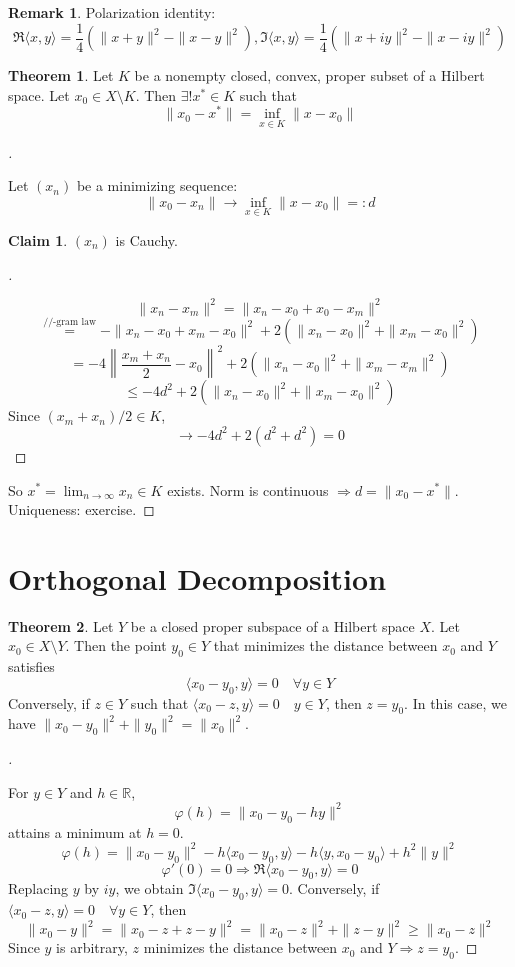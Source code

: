 \documentclass{article}
\theoremstyle{definition}
\newtheorem{thm}{Theorem}
\newtheorem{rem}{Remark}
\newtheorem*{clm}{Claim}
\newenvironment{proofs}[1][\proofname]{%
  \begin{proof}[#1]$ $\par\nobreak\ignorespaces
}{%
  \end{proof}
}
\begin{document}
\begin{rem}
	Polarization identity:
	\[
		\Re \langle x, y \rangle = \frac{1}{4} (\|x + y \|^2 - \|x - y \|^2), \Im \langle x, y \rangle = \frac{1}{4} (\|x + iy\|^2 - \|x - iy \|^2)
	\]
\end{rem}

\begin{thm}
	Let $K$ be a nonempty closed, convex, proper subset of a Hilbert space.
	Let $x_0 \in X \setminus K$.
	Then $\exists ! x^* \in K$ such that
	\[
		\|x_0 - x^*\| = \inf_{x \in K} \|x - x_0\|
	\]
\end{thm}

\begin{proofs}
	Let $(x_n)$ be a minimizing sequence:
	\[
		\|x_0 - x_n\| \to \inf_{x \in K} \|x - x_0\| =: d
	\]
	\begin{clm}
		$(x_n)$ is Cauchy.
	\end{clm}

	\begin{proofs}
		\[
			\|x_n - x_m\|^2 = \|x_n - x_0 + x_0 - x_m\|^2
		\]
		\[
			\stackrel{\text{//-gram law}}{=} - \|x_n - x_0 + x_m - x_0\|^2 + 2 (\|x_n - x_0\|^2 + \|x_m - x_0\|^2)
		\]
		\[
			= -4 \left\| \frac{x_m + x_n}{2} - x_0 \right\|^2 + 2 (\|x_n - x_0\|^2 + \|x_m - x_m\|^2)
		\]
		\[
			\leq -4d^2 + 2(\|x_n - x_0\|^2 + \|x_m - x_0\|^2)
		\]
		Since $(x_m + x_n)/2 \in K$, 
		\[
			\to -4d^2 + 2(d^2 + d^2) = 0
		\]
	\end{proofs}
	So $x^* = \lim_{n \to \infty} x_n \in K$ exists.
	Norm is continuous $\Rightarrow d = \|x_0 - x^*\|$.
	Uniqueness: exercise.
\end{proofs}

\section{Orthogonal Decomposition}

\begin{thm}
	Let $Y$ be a closed proper subspace of a Hilbert space $X$.
	Let $x_0 \in X \setminus Y$.
	Then the point $y_0 \in Y$ that minimizes the distance between $x_0$ and $Y$ satisfies
	\[
		\langle x_0 - y_0 , y \rangle = 0 \quad \forall y \in Y
	\]
	Conversely, if $z \in Y$ such that $\langle x_0 - z, y \rangle = 0 \quad y \in Y$, then $z = y_0$.
	In this case, we have $\|x_0 - y_0\|^2 + \|y_0\|^2 = \|x_0\|^2$.
\end{thm}

\begin{proofs}
	For $y \in Y$ and $h \in \mathbb{R}$, 
	\[
		\varphi(h) = \|x_0 - y_0 - hy\|^2
	\]
	attains a minimum at $h = 0$.
	\[
		\varphi(h) = \|x_0 - y_0\|^2 - h \langle x_0 - y_0 , y \rangle - h \langle y, x_0 - y_0 \rangle + h^2 \|y\|^2
	\]
	\[
		\varphi'(0) = 0 \Rightarrow \Re \langle x_0 - y_0, y \rangle = 0
	\]
	Replacing $y$ by $iy$, we obtain $\Im \langle x_0 - y_0, y \rangle = 0$.
	Conversely, if $\langle x_0 - z, y \rangle = 0 \quad \forall y \in Y$, then 
	\[
		\|x_0 - y\|^2 = \|x_0 - z + z - y\|^2 = \|x_0 - z\|^2 + \|z - y\|^2 \geq \|x_0 - z\|^2
	\]
	Since $y$ is arbitrary, $z$ minimizes the distance between $x_0$ and $Y \Rightarrow z = y_0$.
\end{proofs}
\end{document}
